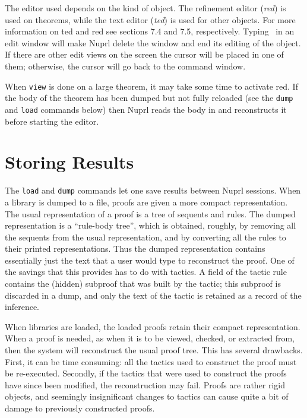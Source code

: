 \begin {description}
    The editor used depends on the kind of object.
    The refinement editor ({\em red}) is used on theorems, while the 
    text{} editor ({\em ted}) is used for other objects.
    For more information on ted and red see sections 7.4 and 7.5, respectively.
    Typing \EXIT\ in an edit window will make Nuprl delete the
    window and end its editing of the object.
    If there are other edit views on the screen the cursor will be placed in one of
    them; otherwise, the cursor will go back to the command window.

    When {\tt view} is done on a large theorem, it may take some time to
    activate red.
    If the body of the theorem has been dumped but not fully reloaded
    (see the {\tt dump} and {\tt load} commands below) then Nuprl reads the
    body in and reconstructs it before starting the editor.

\end {description}

\section{Storing Results}

The {\tt load} and {\tt dump} commands let one save results between Nuprl
sessions.  When a library is dumped to a file, proofs are given a more
compact representation.  The usual representation of a proof is a tree of
sequents and rules.  The dumped representation is a ``rule-body tree'', which
is obtained, roughly, by removing all the sequents from the usual
representation, and by converting all the rules to their printed
representations.  Thus the dumped representation contains essentially just
the text that a user would type to reconstruct the proof.  One of the 
savings that this provides has to do with tactics.  A field of the tactic
rule contains the (hidden) subproof that was built by the tactic; this
subproof is discarded in a dump, and only the text of the tactic is
retained as a record of the inference.

When libraries are loaded, the loaded proofs retain their compact
representation.  When a proof is needed, as when it is to be viewed,
checked, or extracted from, then the system will reconstruct the usual
proof tree.  This has several drawbacks.  First, it can be time
consuming: all the tactics used to construct the proof must be
re-executed.  Secondly, if the tactics that were used to construct the
proofs have since been modified, the reconstruction may fail.  Proofs
are rather rigid objects, and seemingly insignificant changes to
tactics can cause quite a bit of damage to previously constructed
proofs.  

